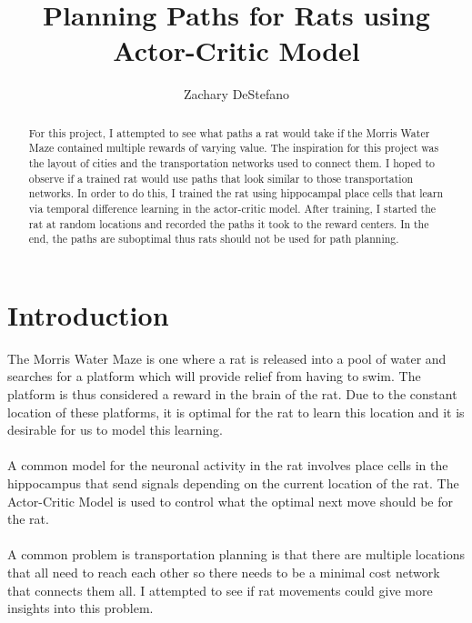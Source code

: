 \documentclass[conference]{IEEEtran}
\begin{document}
\title{Planning Paths for Rats using Actor-Critic Model}


\author{Zachary DeStefano}

\maketitle


\begin{abstract}
For this project, I attempted to see what paths a rat would take if the Morris Water Maze contained multiple rewards of varying value. The inspiration for this project was the layout of cities and the transportation networks used to connect them. I hoped to observe if a trained rat would use paths that look similar to those transportation networks. In order to do this, I trained the rat using hippocampal place cells that learn via temporal difference learning in the actor-critic model. After training, I started the rat at random locations and recorded the paths it took to the reward centers. In the end, the paths are suboptimal thus rats should not be used for path planning. 
\end{abstract}

\IEEEpeerreviewmaketitle



\section{Introduction}

The Morris Water Maze is one where a rat is released into a pool of water and searches for a platform which will provide relief from having to swim. The platform is thus considered a reward in the brain of the rat. Due to the constant location of these platforms, it is optimal for the rat to learn this location and it is desirable for us to model this learning.\\
\\
A common model for the neuronal activity in the rat involves place cells in the hippocampus that send signals depending on the current location of the rat. The Actor-Critic Model is used to control what the optimal next move should be for the rat. \\
\\
A common problem is transportation planning is that there are multiple locations that all need to reach each other so there needs to be a minimal cost network that connects them all. I attempted to see if rat movements could give more insights into this problem. \\
\end{document}
